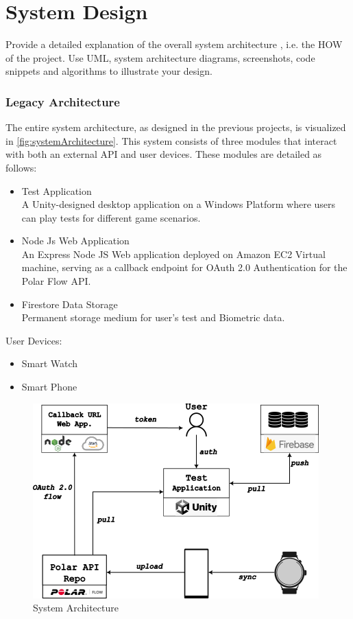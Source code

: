 \chapter{System Design}
Provide a detailed explanation of the overall system architecture \cite{lin1991divergence}, i.e. the HOW of the project.
Use UML, system architecture diagrams, screenshots, code snippets and algorithms to illustrate your design.

\subsection*{Legacy Architecture}

The entire system architecture, as designed in the previous projects, is visualized in \autoref{fig:systemArchitecture}. This system consists of three modules that interact with both an external API and user devices. These modules are detailed as follows:

\begin{itemize}
\item{Test Application}\\
A Unity-designed desktop application on a Windows Platform where users can play tests for different game scenarios.
\item {Node Js Web Application}\\
An Express Node JS Web application deployed on Amazon EC2 Virtual machine, serving as a callback endpoint for OAuth 2.0 Authentication for the Polar Flow API. 
\item {Firestore Data Storage}\\
Permanent storage medium for user's test and Biometric data.
\end{itemize}
User Devices:
\begin{itemize}
\item{Smart Watch}
\item {Smart Phone}
\end{itemize}

\begin{figure}[h]
\includegraphics{images/architecture.png}
\caption{System Architecture}
\label{fig:systemArchitecture}
\centering
\end{figure}

